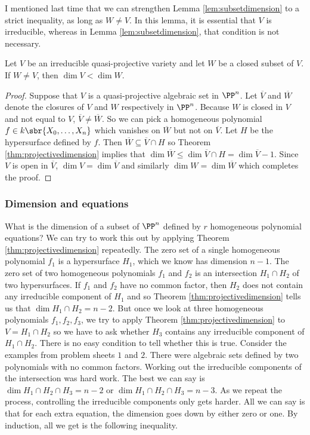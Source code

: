 I mentioned last time that we can strengthen Lemma \ref{lem:subsetdimension} to a strict inequality, as long as $ W \ne V $. In this lemma, it is essential that $ V $ is irreducible, whereas in Lemma \ref{lem:subsetdimension}, that condition is not necessary.

\begin{lemma}
\label{lem:properdimension}
Let $ V $ be an irreducible quasi-projective variety and let $ W $ be a closed subset of $ V $. If $ W \ne V $, then $ \dim V < \dim W $.
\end{lemma}

\begin{proof}
Suppose that $ V $ is a quasi-projective algebraic set in $ \PP^n $. Let $ \overline{V} $ and $ \overline{W} $ denote the closures of $ V $ and $ W $ respectively in $ \PP^n $. Because $ W $ is closed in $ V $ and not equal to $ V $, $ \overline{V} \ne \overline{W} $. So we can pick a homogeneous polynomial $ f \in k\sbr{X_0, \dots, X_n} $ which vanishes on $ \overline{W} $ but not on $ \overline{V} $. Let $ H $ be the hypersurface defined by $ f $. Then $ \overline{W} \subseteq \overline{V} \cap H $ so Theorem \ref{thm:projectivedimension} implies that $ \dim \overline{W} \le \dim \overline{V} \cap H = \dim \overline{V} - 1 $. Since $ V $ is open in $ \overline{V} $, $ \dim V = \dim \overline{V} $ and similarly $ \dim W = \dim \overline{W} $ which completes the proof.
\end{proof}

\subsubsection{Dimension and equations}

What is the dimension of a subset of $ \PP^n $ defined by $ r $ homogeneous polynomial equations? We can try to work this out by applying Theorem \ref{thm:projectivedimension} repeatedly. The zero set of a single homogeneous polynomial $ f_1 $ is a hypersurface $ H_1 $, which we know has dimension $ n - 1 $. The zero set of two homogeneous polynomials $ f_1 $ and $ f_2 $ is an intersection $ H_1 \cap H_2 $ of two hypersurfaces. If $ f_1 $ and $ f_2 $ have no common factor, then $ H_2 $ does not contain any irreducible component of $ H_1 $ and so Theorem \ref{thm:projectivedimension} tells us that $ \dim H_1 \cap H_2 = n - 2 $. But once we look at three homogeneous polynomials $ f_1, f_2, f_3 $, we try to apply Theorem \ref{thm:projectivedimension} to $ V = H_1 \cap H_2 $ so we have to ask whether $ H_3 $ contains any irreducible component of $ H_1 \cap H_2 $. There is no easy condition to tell whether this is true. Consider the examples from problem sheets $ 1 $ and $ 2 $. There were algebraic sets defined by two polynomials with no common factors. Working out the irreducible components of the intersection was hard work. The best we can say is $ \dim H_1 \cap H_2 \cap H_3 = n - 2 $ or $ \dim H_1 \cap H_2 \cap H_3 = n - 3 $. As we repeat the process, controlling the irreducible components only gets harder. All we can say is that for each extra equation, the dimension goes down by either zero or one. By induction, all we get is the following inequality.

